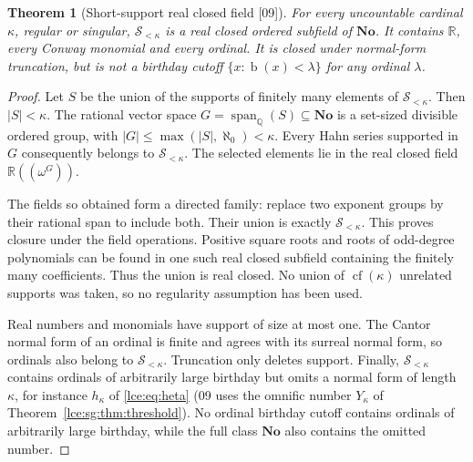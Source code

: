 \documentclass[11pt,letterpaper]{article}
\numberwithin{equation}{section}
\newtheorem{theorem}{Theorem}[section]
\theoremstyle{definition}
\theoremstyle{remark}
\newcommand{\No}{\mathbf{No}}
\newcommand{\R}{\mathbb R}
\newcommand{\Q}{\mathbb Q}
\newcommand{\bd}{\operatorname{b}}
\newcommand{\Sk}{\mathscr S_{<\kappa}}
\newcommand{\abs}[1]{\lvert#1\rvert}
\newcommand{\thref}[1]{Theorem~\ref{#1}}
\newcommand{\src}[1]{\textup{\textsf{\small[#1]}}}%
\newcommand{\cf}{\operatorname{cf}}
\newcommand{\Span}{\operatorname{span}_{\Q}}
\newcommand{\Hahn}[1]{\R((\omega^{#1}))}
\begin{document}
\begin{theorem}[Short-support real closed field \src{09}]\label{lce:sg:thm:shortfield}
For every uncountable cardinal $\kappa$, regular or singular, $\Sk$ is a
real closed ordered subfield of $\No$. It contains $\R$, every Conway
monomial and every ordinal. It is closed under normal-form truncation, but
is not a birthday cutoff $\{x:\bd(x)<\lambda\}$ for any ordinal $\lambda$.
\end{theorem}
\begin{proof}
Let $S$ be the union of the supports of finitely many elements of $\Sk$.
Then $\abs S<\kappa$. The rational vector space $G=\Span(S)\subseteq\No$ is a
set-sized divisible ordered group, with $\abs G\le\max(\abs S,\aleph_0)<\kappa$.
Every Hahn series supported in $G$ consequently belongs to $\Sk$. The
selected elements lie in the real closed field $\Hahn G$.

The fields so obtained form a directed family: replace two exponent groups
by their rational span to include both. Their union is exactly $\Sk$. This
proves closure under the field operations. Positive square roots and roots
of odd-degree polynomials can be found in one such real closed subfield
containing the finitely many coefficients. Thus the union is real closed.
No union of $\cf(\kappa)$ unrelated supports was taken, so no regularity
assumption has been used.

Real numbers and monomials have support of size at most one. The Cantor
normal form of an ordinal is finite and agrees with its surreal normal form,
so ordinals also belong to $\Sk$. Truncation only deletes support. Finally,
$\Sk$ contains ordinals of arbitrarily large birthday but omits a normal form
of length $\kappa$, for instance $h_\kappa$ of \eqref{lce:eq:heta} (09 uses
the omnific number $Y_\kappa$ of \thref{lce:sg:thm:threshold}). No ordinal
birthday cutoff contains ordinals of arbitrarily large birthday, while the
full class $\No$ also contains the omitted number.
\end{proof}
\end{document}
